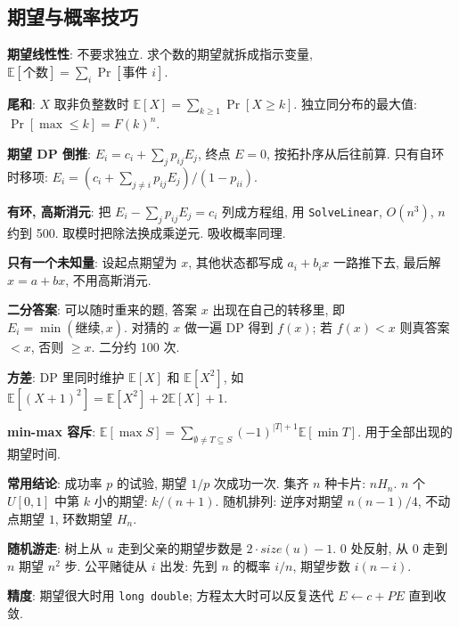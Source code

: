\subsection{期望与概率技巧}
\begin{compactitem}
\item \textbf{期望线性性}: 不要求独立. 求个数的期望就拆成指示变量, $\mathbb{E}[\text{个数}]=\sum_i \Pr[\text{事件 } i]$.
\item \textbf{尾和}: $X$ 取非负整数时 $\mathbb{E}[X]=\sum_{k\ge1}\Pr[X\ge k]$. 独立同分布的最大值: $\Pr[\max\le k]=F(k)^n$.
\item \textbf{期望 DP 倒推}: $E_i=c_i+\sum_j p_{ij}E_j$, 终点 $E=0$, 按拓扑序从后往前算.
  只有自环时移项: $E_i=(c_i+\sum_{j\ne i}p_{ij}E_j)/(1-p_{ii})$.
\item \textbf{有环, 高斯消元}: 把 $E_i-\sum_j p_{ij}E_j=c_i$ 列成方程组, 用 \texttt{SolveLinear}, $O(n^3)$, $n$ 约到 500.
  取模时把除法换成乘逆元. 吸收概率同理.
\item \textbf{只有一个未知量}: 设起点期望为 $x$, 其他状态都写成 $a_i+b_ix$ 一路推下去, 最后解 $x=a+bx$, 不用高斯消元.
\item \textbf{二分答案}: 可以随时重来的题, 答案 $x$ 出现在自己的转移里, 即 $E_i=\min(\text{继续}, x)$.
  对猜的 $x$ 做一遍 DP 得到 $f(x)$; 若 $f(x)<x$ 则真答案 $<x$, 否则 $\ge x$. 二分约 100 次.
\item \textbf{方差}: DP 里同时维护 $\mathbb{E}[X]$ 和 $\mathbb{E}[X^2]$, 如 $\mathbb{E}[(X+1)^2]=\mathbb{E}[X^2]+2\mathbb{E}[X]+1$.
\item \textbf{min-max 容斥}: $\mathbb{E}[\max S]=\sum_{\emptyset\ne T\subseteq S}(-1)^{|T|+1}\mathbb{E}[\min T]$. 用于全部出现的期望时间.
\item \textbf{常用结论}: 成功率 $p$ 的试验, 期望 $1/p$ 次成功一次. 集齐 $n$ 种卡片: $nH_n$.
  $n$ 个 $U[0,1]$ 中第 $k$ 小的期望: $k/(n+1)$.
  随机排列: 逆序对期望 $n(n-1)/4$, 不动点期望 $1$, 环数期望 $H_n$.
\item \textbf{随机游走}: 树上从 $u$ 走到父亲的期望步数是 $2\cdot\mathit{size}(u)-1$.
  $0$ 处反射, 从 $0$ 走到 $n$ 期望 $n^2$ 步. 公平赌徒从 $i$ 出发: 先到 $n$ 的概率 $i/n$, 期望步数 $i(n-i)$.
\item \textbf{精度}: 期望很大时用 \texttt{long double}; 方程太大时可以反复迭代 $E\leftarrow c+PE$ 直到收敛.
\end{compactitem}

